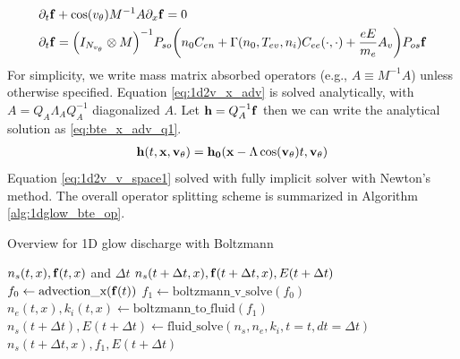 \documentclass{article}[draft]
\begin{document}
\begin{align}
	&\partial_t \vect{f} + \cos\of{\vtheta} M^{-1} A \partial_x \vect{f} = 0 \label{eq:1d2v_x_adv} \\
	&\partial_t \vect{f} =\of{I_{N_{\vtheta}} \otimes M  }^{-1} P_{so}\of{n_0 C_{en} + \Gamma(n_0, T_{ev}, n_i) C_{ee} (\cdot, \cdot) + \frac{e E}{m_e} A_v} P_{os} \vect{f} \label{eq:1d2v_v_space1}
\end{align} For simplicity, we write mass matrix absorbed operators (e.g., $A \equiv M^{-1} A$) unless otherwise specified. Equation \eqref{eq:1d2v_x_adv} is solved analytically, with $A=Q_A \Lambda_A Q_A^{-1}$ diagonalized $A$. Let $\mathbf{h} = Q_{A}^{-1}\mathbf{f}$ then we can write the analytical solution as \eqref{eq:bte_x_adv_q1}.
\begin{align}
	\mathbf{h}(t,\mathbf{x},\mathbf{{v_{\theta}}}) = \mathbf{h_0}(\mathbf{x} - \Lambda\cos(\mathbf{{v_{\theta}}}) t, \mathbf{{v_{\theta}}}) \label{eq:bte_x_adv_q1}
\end{align} Equation \eqref{eq:1d2v_v_space1} solved with fully implicit solver with Newton's method. 
The overall operator splitting scheme is summarized in Algorithm \ref{alg:1dglow_bte_op}.

\begin{algorithm}[!tbhp]
	\caption{Overview for 1D glow discharge with Boltzmann \label{alg:1dglow_bte_op}}
	\begin{algorithmic}[0]
		\Require $n_s(t,x), \mathbf{f}(t,x)$ and $\Delta t$
		\Ensure $n_s(t + \Delta t, x), \mathbf{f}(t + \Delta t, x), E(t+\Delta t)$ 
		\State $f_0 \leftarrow \text{advection\_x} (\mathbf{f}(t))$
		\State $f_1 \leftarrow \text{boltzmann\_v\_solve} (f_0) $
		\State $n_e(t, x), k_i(t, x) \leftarrow \text{boltzmann\_to\_fluid}(f_1)$ 
		\State $n_s(t + \Delta t), E(t+\Delta t) \leftarrow \text{fluid\_solve}(n_s, n_e, k_i, t = t, dt=\Delta t)$
		\State \Return $n_s(t + \Delta t, x), f_1, E(t+\Delta t)$ 
	\end{algorithmic}
\end{algorithm}
\ \ 
\newpage
\end{document}

